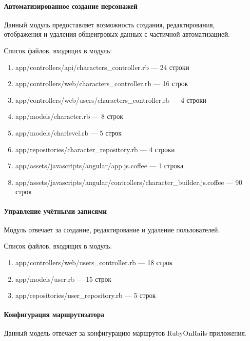 \paragraph{Автоматизированное создание персонажей}

Данный модуль предоставляет возможность создания, редактирования, отображения и удаления общеигровых данных с частичной автоматизацией.

Список файлов, входящих в модуль:
\begin{enumerate}[label=\arabic*)]
\item app/controllers/api/characters\_controller.rb --- 24 строки
\item app/controllers/web/characters\_controller.rb --- 16 строк
\item app/controllers/web/users/characters\_controller.rb --- 4 строки
\item app/models/character.rb --- 8 строк
\item app/models/charlevel.rb --- 5 строк
\item app/repositories/character\_repository.rb --- 4 строки
\item app/assets/javascripts/angular/app.js.coffee --- 1 строка
\item app/assets/javascripts/angular/controllers/character\_builder.js.coffee --- 90 строк
\end{enumerate}


\paragraph{Управление учётными записями}

Модуль отвечает за создание, редактирование и удаление пользователей.

Список файлов, входящих в модуль:
\begin{enumerate}[label=\arabic*)]
\item app/controllers/web/users\_controller.rb --- 18 строк
\item app/models/user.rb --- 15 строк
\item app/repositories/user\_repository.rb --- 5 строк
\end{enumerate}


\paragraph{Конфигурация маршрутизатора}

Данный модель отвечает за конфигурацию маршрутов RubyOnRails-приложения.

